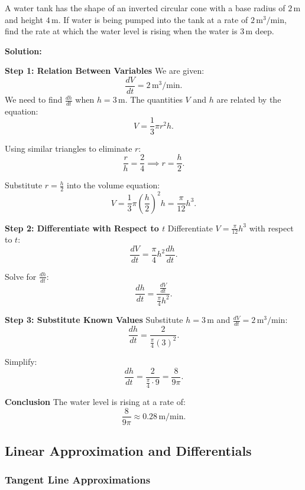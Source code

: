 \documentclass[12pt]{article}
\theoremstyle{beautifulthm}
\begin{document}
\begin{tcolorbox}[colback=examplebg, colframe=red!75!black, title=\textbf{EXAMPLE 3: Rising Water Level in a Cone}, fonttitle=\bfseries, sharp corners]
A water tank has the shape of an inverted circular cone with a base radius of \( 2 \, \text{m} \) and height \( 4 \, \text{m} \). If water is being pumped into the tank at a rate of \( 2 \, \text{m}^3/\text{min} \), find the rate at which the water level is rising when the water is \( 3 \, \text{m} \) deep.




\tcblower
\textbf{Solution:} 

\textbf{Step 1: Relation Between Variables}
We are given:
\[
\frac{dV}{dt} = 2 \, \text{m}^3/\text{min}.
\]
We need to find \( \frac{dh}{dt} \) when \( h = 3 \, \text{m} \). The quantities \( V \) and \( h \) are related by the equation:
\[
V = \frac{1}{3} \pi r^2 h.
\]

Using similar triangles to eliminate \( r \):
\[
\frac{r}{h} = \frac{2}{4} \implies r = \frac{h}{2}.
\]

Substitute \( r = \frac{h}{2} \) into the volume equation:
\[
V = \frac{1}{3} \pi \left( \frac{h}{2} \right)^2 h = \frac{\pi}{12} h^3.
\]

\textbf{Step 2: Differentiate with Respect to \( t \)}
Differentiate \( V = \frac{\pi}{12} h^3 \) with respect to \( t \):
\[
\frac{dV}{dt} = \frac{\pi}{4} h^2 \frac{dh}{dt}.
\]

Solve for \( \frac{dh}{dt} \):
\[
\frac{dh}{dt} = \frac{\frac{dV}{dt}}{\frac{\pi}{4} h^2}.
\]

\textbf{Step 3: Substitute Known Values}
Substitute \( h = 3 \, \text{m} \) and \( \frac{dV}{dt} = 2 \, \text{m}^3/\text{min} \):
\[
\frac{dh}{dt} = \frac{2}{\frac{\pi}{4} (3)^2}.
\]

Simplify:
\[
\frac{dh}{dt} = \frac{2}{\frac{\pi}{4} \cdot 9} = \frac{8}{9\pi}.
\]

\textbf{Conclusion}
The water level is rising at a rate of:
\[
\frac{8}{9\pi} \approx 0.28 \, \text{m/min}.
\]
\end{tcolorbox}
\newpage






\subsection{Linear Approximation and Differentials}
\subsubsection{Tangent Line Approximations}
\end{document}
